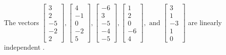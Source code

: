 \begin{exercise}
\begin{exerciseStatement}
  \end{exerciseStatement}
  \begin{exerciseAnswer}
   The vectors \(\left[\begin{array}{r}
3 \\
2 \\
-5 \\
-2 \\
2
\end{array}\right] , \left[\begin{array}{r}
4 \\
-1 \\
0 \\
-2 \\
5
\end{array}\right] , \left[\begin{array}{r}
-6 \\
3 \\
-5 \\
-4 \\
-5
\end{array}\right] , \left[\begin{array}{r}
1 \\
2 \\
0 \\
-6 \\
4
\end{array}\right] , \text{ and } \left[\begin{array}{r}
3 \\
1 \\
-3 \\
1 \\
0
\end{array}\right]\) are 
  	 linearly independent  .
  


  \end{exerciseAnswer}
\end{exercise}